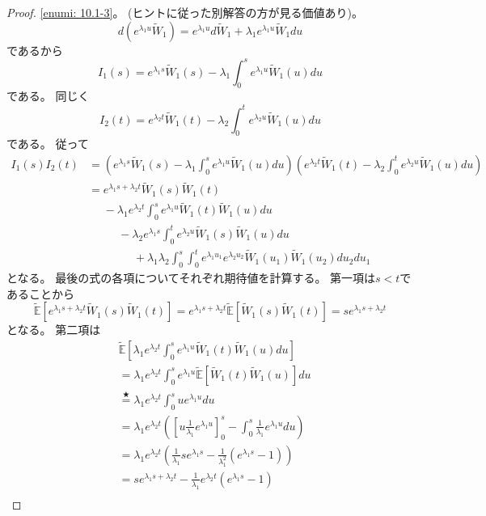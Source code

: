 \documentclass[uplatex]{jsarticle}
\theoremstyle{definition}
\def\E{\mathbb{E}}
\begin{document}
\begin{proof}
  \ref{enumi: 10.1-3}。
  (ヒントに従った別解答の方が見る価値あり)。
  \[
  d\left(e^{\lambda_1u}\tilde{W}_1\right)
  = e^{\lambda_1u}d\tilde{W}_1 + \lambda_1e^{\lambda_1u}\tilde{W}_1du
  \]
  であるから
  \[
  I_1(s) = e^{\lambda_1s}\tilde{W}_1(s)
  - \lambda_1\int_0^se^{\lambda_1u}\tilde{W}_1(u)du
  \]
  である。
  同じく
  \[
  I_2(t) = e^{\lambda_2t}\tilde{W}_1(t)
  - \lambda_2\int_0^te^{\lambda_2u}\tilde{W}_1(u)du
  \]
  である。
  従って
  \begin{align*}
    I_1(s)I_2(t)
    &= \left( e^{\lambda_1s}\tilde{W}_1(s)
    - \lambda_1\int_0^se^{\lambda_1u}\tilde{W}_1(u)du\right)
    \left( e^{\lambda_2t}\tilde{W}_1(t)
    - \lambda_2\int_0^te^{\lambda_2u}\tilde{W}_1(u)du\right) \\
    &= e^{\lambda_1s+\lambda_2t}\tilde{W}_1(s)\tilde{W}_1(t) \\
    &\ \ \ \ \ \
    - \lambda_1e^{\lambda_2t}\int_0^s
    e^{\lambda_1u}\tilde{W}_1(t)\tilde{W}_1(u)du \\
    &\ \ \ \ \ \ \ \ \ \ \ \
    - \lambda_2e^{\lambda_1s}\int_0^t
    e^{\lambda_2u}\tilde{W}_1(s)\tilde{W}_1(u)du \\
    &\ \ \ \ \ \ \ \ \ \ \ \ \ \ \ \ \ \
    + \lambda_1\lambda_2\int_0^s\int_0^t
    e^{\lambda_1u_1}e^{\lambda_2u_2}\tilde{W}_1(u_1)\tilde{W}_1(u_2)du_2du_1
  \end{align*}
  となる。
  最後の式の各項についてそれぞれ期待値を計算する。
  第一項は\(s<t\)であることから
  \[
  \tilde{\E}[e^{\lambda_1s+\lambda_2t}\tilde{W}_1(s)\tilde{W}_1(t)]
  = e^{\lambda_1s+\lambda_2t}\tilde{\E}[\tilde{W}_1(s)\tilde{W}_1(t)]
  = se^{\lambda_1s+\lambda_2t}
  \]
  となる。
  第二項は
  \begin{align*}
    &\tilde{\E}\left[ \lambda_1e^{\lambda_2t}\int_0^s
    e^{\lambda_1u}\tilde{W}_1(t)\tilde{W}_1(u)du\right] \\
    &= \lambda_1e^{\lambda_2t}\int_0^se^{\lambda_1u}
    \tilde{\E}\left[ \tilde{W}_1(t)\tilde{W}_1(u)\right] du \\
    &\overset{\bigstar}{=} \lambda_1e^{\lambda_2t}\int_0^sue^{\lambda_1u} du \\
    &= \lambda_1e^{\lambda_2t}
    \left( \left[ u\frac{1}{\lambda_1}e^{\lambda_1u}\right]_0^s
    - \int_0^s\frac{1}{\lambda_1}e^{\lambda_1u}du\right) \\
    &= \lambda_1e^{\lambda_2t}
    \left( \frac{1}{\lambda_1}se^{\lambda_1s}
    - \frac{1}{\lambda_1^2}\left( e^{\lambda_1s} - 1 \right)\right) \\
    &= se^{\lambda_1s+\lambda_2t}
    - \frac{1}{\lambda_1}e^{\lambda_2t}\left( e^{\lambda_1s} - 1 \right) \\

\end{align*}
\end{proof}
\end{document}
